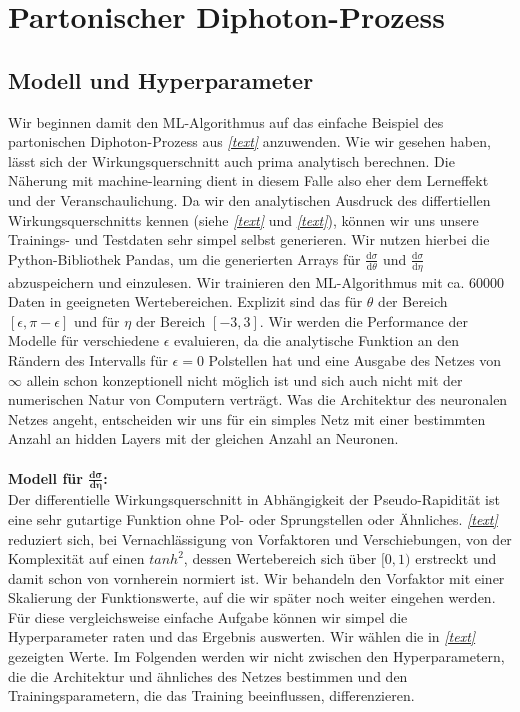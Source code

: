 \section{Partonischer Diphoton-Prozess}
\subsection{Modell und Hyperparameter}
Wir beginnen damit den ML-Algorithmus auf das einfache Beispiel des partonischen Diphoton-Prozess aus \textit{\autoref{text}} anzuwenden. Wie wir gesehen haben, lässt sich der Wirkungsquerschnitt auch prima analytisch berechnen. Die Näherung mit machine-learning dient in diesem Falle also eher dem Lerneffekt und der Veranschaulichung. 
Da wir den analytischen Ausdruck des differtiellen Wirkungsquerschnitts kennen (siehe \textit{\autoref{text}} und \textit{\autoref{text}}), können wir uns unsere Trainings- und Testdaten sehr simpel selbst generieren. Wir nutzen hierbei die Python-Bibliothek Pandas, um die generierten Arrays für $\frac{\text{d}\sigma}{\text{d} \theta}$ und $\frac{\text{d}\sigma}{\text{d} \eta}$ abzuspeichern und einzulesen. Wir trainieren den ML-Algorithmus mit ca. 60000 Daten in geeigneten Wertebereichen. Explizit sind das für $\theta$ der Bereich $[\epsilon, \pi - \epsilon]$ und für $\eta$ der Bereich $[-3, 3]$. Wir werden die Performance der Modelle für verschiedene $\epsilon$ evaluieren, da die analytische Funktion an den Rändern des Intervalls für $\epsilon = 0$ Polstellen hat und eine Ausgabe des Netzes von $\infty$ allein schon konzeptionell nicht möglich ist und sich auch nicht mit der numerischen Natur von Computern verträgt. Was die Architektur des neuronalen Netzes angeht, entscheiden wir uns für ein simples Netz mit einer bestimmten Anzahl an hidden Layers mit der gleichen Anzahl an Neuronen.
\\
\\
\textbf{Modell für $\mathbf{\frac{d\sigma}{d\eta}}$:} \\
Der differentielle Wirkungsquerschnitt in Abhängigkeit der Pseudo-Rapidität ist eine sehr gutartige Funktion ohne Pol- oder Sprungstellen oder Ähnliches. \textit{\autoref{text}} reduziert sich, bei Vernachlässigung von Vorfaktoren und Verschiebungen, von der Komplexität auf einen $tanh^2$, dessen Wertebereich sich über $[0,1)$ erstreckt und damit schon von vornherein normiert ist. Wir behandeln den Vorfaktor mit einer Skalierung der Funktionswerte, auf die wir später noch weiter eingehen werden. 
Für diese vergleichsweise einfache Aufgabe können wir simpel die Hyperparameter raten und das Ergebnis auswerten. Wir wählen die in \textit{\autoref{text}} gezeigten Werte. Im Folgenden werden wir nicht zwischen den Hyperparametern, die die Architektur und ähnliches des Netzes bestimmen und den Trainingsparametern, die das Training beeinflussen, differenzieren.
